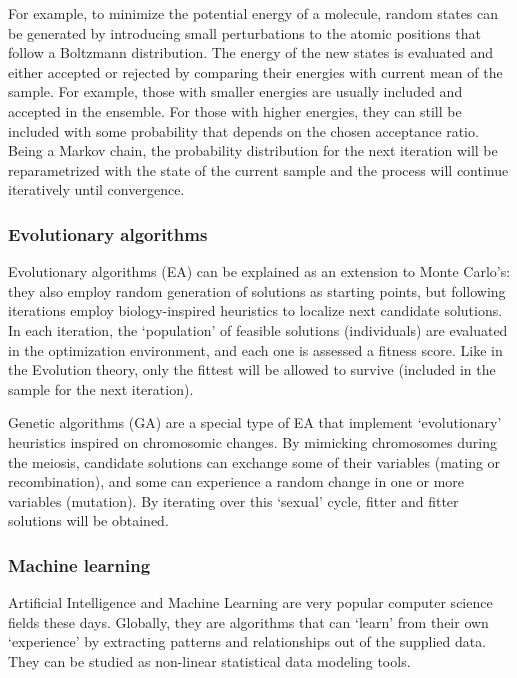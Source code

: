 For example, to minimize the potential energy of a molecule, random states can be generated by introducing small perturbations to the atomic positions that follow a Boltzmann distribution. The energy of the new states is evaluated and either accepted or rejected by comparing their energies with current mean of the sample. For example, those with smaller energies are usually included and accepted in the ensemble. For those with higher energies, they can still be included with some probability that depends on the chosen acceptance ratio. Being a Markov chain, the probability distribution for the next iteration will be reparametrized with the state of the current sample and the process will continue iteratively until convergence.

\subsubsection{Evolutionary algorithms}
Evolutionary algorithms (EA) can be explained as an extension to Monte Carlo’s: they also employ random generation of solutions as starting points, but following iterations employ biology-inspired heuristics to localize next candidate solutions. In each iteration, the ‘population’ of feasible solutions (individuals) are evaluated in the optimization environment, and each one is assessed a fitness score. Like in the Evolution theory, only the fittest will be allowed to survive (included in the sample for the next iteration).

Genetic algorithms (GA) are a special type of EA that implement ‘evolutionary’ heuristics inspired on chromosomic changes. By mimicking chromosomes during the meiosis, candidate solutions can exchange some of their variables (mating or recombination), and some can experience a random change in one or more variables (mutation). By iterating over this ‘sexual’ cycle, fitter and fitter solutions will be obtained.

\subsubsection{Machine learning }
Artificial Intelligence and Machine Learning are very popular computer science fields these days. Globally, they are algorithms that can ‘learn’ from their own ‘experience’ by extracting patterns and relationships out of the supplied data. They can be studied as non-linear statistical data modeling tools.

